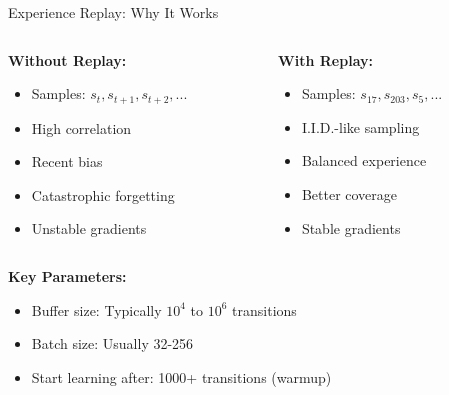 \documentclass[aspectratio=169,10pt]{beamer}
\begin{document}
\begin{frame}{Experience Replay: Why It Works}
\begin{columns}[T]
\begin{column}{0.5\textwidth}
\textbf{Without Replay:}
\begin{itemize}
    \item Samples: $s_t, s_{t+1}, s_{t+2}, ...$
    \item High correlation
    \item Recent bias
    \item Catastrophic forgetting
    \item Unstable gradients
\end{itemize}
\end{column}
\begin{column}{0.5\textwidth}
\textbf{With Replay:}
\begin{itemize}
    \item Samples: $s_{17}, s_{203}, s_{5}, ...$
    \item I.I.D.-like sampling
    \item Balanced experience
    \item Better coverage
    \item Stable gradients
\end{itemize}
\end{column}
\end{columns}

\vspace{0.5cm}
\textbf{Key Parameters:}
\begin{itemize}
    \item Buffer size: Typically $10^4$ to $10^6$ transitions
    \item Batch size: Usually 32-256
    \item Start learning after: 1000+ transitions (warmup)
\end{itemize}

\end{frame}
\end{document}
